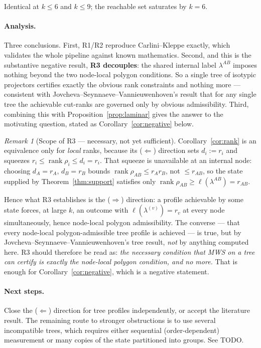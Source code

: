 \documentclass[11pt]{article}
\theoremstyle{definition}
\theoremstyle{remark}
\newtheorem{remark}[theorem]{Remark}
\newcommand{\rank}{\operatorname{rank}}
\begin{document}
\medskip
\noindent Identical at $k \le 6$ and $k \le 9$; the reachable set saturates by $k = 6$.

\paragraph{Analysis.}
Three conclusions. First, R1/R2 reproduce Carlini--Kleppe exactly, which validates the
whole pipeline against known mathematics. Second, and this is the substantive negative
result, \textbf{R3 decouples}: the shared internal label $\lambda^{AB}$ imposes nothing
beyond the two node-local polygon conditions. So a single tree of isotypic projectors
certifies exactly the obvious rank constraints and nothing more --- consistent with
Jovcheva--Seynnaeve--Vannieuwenhoven's result that for any single tree the achievable
cut-ranks are governed only by obvious admissibility. Third, combining this with
Proposition~\ref{prop:laminar} gives the answer to the motivating question, stated as
Corollary~\ref{cor:negative} below.

\begin{remark}[Scope of R3 --- necessary, not yet sufficient]
\label{rem:r3scope}
Corollary~\ref{cor:rank} is an equivalence only for \emph{local} ranks, because its
($\Leftarrow$) direction sets $d_i := r_i$ and squeezes
$r_i \le \rank\rho_i \le d_i = r_i$. That squeeze is unavailable at an internal node:
choosing $d_A = r_A$, $d_B = r_B$ bounds $\rank\rho_{AB} \le r_A r_B$, not
$\le r_{AB}$, so the state supplied by Theorem~\ref{thm:support} satisfies only
$\rank\rho_{AB} \ge \ell(\lambda^{AB}) = r_{AB}$.

Hence what R3 establishes is the ($\Rightarrow$) direction: a profile achievable by some
state forces, at large $k$, an outcome with $\ell(\lambda^{(v)}) = r_v$ at every node
simultaneously, hence node-local polygon admissibility. The converse --- that every
node-local polygon-admissible tree profile is achieved --- is true, but by
Jovcheva--Seynnaeve--Vannieuwenhoven's tree result, \emph{not} by anything computed
here. R3 should therefore be read as: \emph{the necessary condition that MWS on a tree
can certify is exactly the node-local polygon condition, and no more.} That is enough
for Corollary~\ref{cor:negative}, which is a negative statement.
\end{remark}

\paragraph{Next steps.}
Close the ($\Leftarrow$) direction for tree profiles independently, or accept the
literature result. The remaining route to stronger obstructions is to use several
incompatible trees, which requires either sequential (order-dependent) measurement or
many copies of the state partitioned into groups. See TODO.
\end{document}
